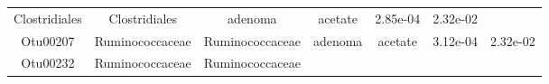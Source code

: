 \documentclass[11pt,]{article}
\begin{document}
\begin{longtable}[]{@{}ccccccc@{}}
\begin{minipage}[t]{0.17\columnwidth}
Clostridiales\strut
\end{minipage} & \begin{minipage}[t]{0.17\columnwidth}\centering\strut
Clostridiales\strut
\end{minipage} & \begin{minipage}[t]{0.09\columnwidth}\centering\strut
adenoma\strut
\end{minipage} & \begin{minipage}[t]{0.11\columnwidth}\centering\strut
acetate\strut
\end{minipage} & \begin{minipage}[t]{0.09\columnwidth}\centering\strut
2.85e-04\strut
\end{minipage} & \begin{minipage}[t]{0.09\columnwidth}\centering\strut
2.32e-02\strut
\end{minipage}\tabularnewline
\begin{minipage}[t]{0.09\columnwidth}\centering\strut
Otu00207\strut
\end{minipage} & \begin{minipage}[t]{0.17\columnwidth}\centering\strut
Ruminococcaceae\strut
\end{minipage} & \begin{minipage}[t]{0.17\columnwidth}\centering\strut
Ruminococcaceae\strut
\end{minipage} & \begin{minipage}[t]{0.09\columnwidth}\centering\strut
adenoma\strut
\end{minipage} & \begin{minipage}[t]{0.11\columnwidth}\centering\strut
acetate\strut
\end{minipage} & \begin{minipage}[t]{0.09\columnwidth}\centering\strut
3.12e-04\strut
\end{minipage} & \begin{minipage}[t]{0.09\columnwidth}\centering\strut
2.32e-02\strut
\end{minipage}\tabularnewline
\begin{minipage}[t]{0.09\columnwidth}\centering\strut
Otu00232\strut
\end{minipage} & \begin{minipage}[t]{0.17\columnwidth}\centering\strut
Ruminococcaceae\strut
\end{minipage} & \begin{minipage}[t]{0.17\columnwidth}\centering\strut
Ruminococcaceae\strut
\end{minipage} & \begin{minipage}[t]{0.09\columnwidth}\centering\strut

\end{minipage}
\end{longtable}
\end{document}
